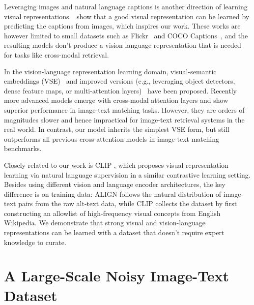 \documentclass{article}
\begin{document}
Leveraging images and natural language captions is another direction of learning visual representations.~\citet{joulin:flickr,li:ngram,desai:virtex,sariyildiz2020learning,zhang2020contrastive} show that a good visual representation can be learned by predicting the captions from images, which inspires our work. These works are however limited to small datasets such as Flickr~\cite{joulin:flickr,li:ngram} and COCO Captions~\cite{desai:virtex,sariyildiz2020learning}, and the resulting models don't produce a vision-language representation that is needed for tasks like cross-modal retrieval.





In the vision-language representation learning domain, visual-semantic embeddings (VSE)~\citep{frome:devise,faghri:vse++} and improved versions (e.g., leveraging object detectors, dense feature maps, or multi-attention layers)~\citep{socher-etal-2014-grounded,karpathy:2014,kiros:2014,nam:dan,li:vsrn,teran,chen:vsepooling} have been proposed.
Recently more advanced models emerge with cross-modal attention layers \cite{liu:mia, lu:vilbert, chen:uniter, pixel-bert} and show superior performance in image-text matching tasks. However, they are orders of magnitudes slower and hence impractical for image-text retrieval systems in the real world. In contrast, our model inherits the simplest VSE form, but still outperforms all previous cross-attention models in image-text matching benchmarks.

Closely related to our work is CLIP \cite{radford:clip}, which proposes visual representation learning via natural language supervision in a similar contrastive learning setting. Besides using different vision and language encoder architectures, the key difference is on training data: ALIGN follows the natural distribution of image-text pairs from the raw alt-text data, while CLIP collects the dataset by first constructing an allowlist of high-frequency visual concepts from English Wikipedia. We demonstrate that strong visual and vision-language representations can be learned with a dataset that doesn't require expert knowledge to curate.

\vspace{-2mm}
\section{A Large-Scale Noisy Image-Text Dataset} \label{data}
\end{document}
